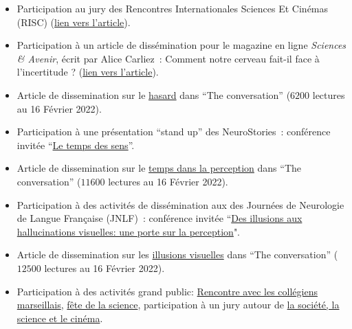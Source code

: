 \documentclass[10pt,french,a4paper,oneside]{article}%
\newcommand{\years}[1]{\marginpar{\textit{\scriptsize #1}}}
\begin{document}
\begin{itemize}
    \item Participation au jury des \og Rencontres Internationales Sciences Et Cinémas (RISC) \fg{} (\href{https://laurentperrinet.github.io/post/2023-12-16-risc/}{lien vers l'article}).

    \item Participation à un article de dissémination pour le magazine en ligne \textit{Sciences \& Avenir}, écrit par Alice Carliez~: \og Comment notre cerveau fait-il face à l'incertitude ? \fg{} (\href{https://laurentperrinet.github.io/post/2023-07-26-epsiloon/}{lien vers l'article}).

	\item Article de dissemination sur le \href{https://laurentperrinet.github.io/publication/perrinet-21-hasard/}{hasard} dans ``The conversation'' ($6200$ lectures au 16 Février 2022). \years{2022}

	\item Participation à une présentation ``stand up'' des NeuroStories~: conférence invitée  ``\href{https://laurentperrinet.github.io/post/2019-10-07_neurostories/}{Le temps des sens}''. \years{2019}

	\item Article de dissemination sur le \href{https://laurentperrinet.github.io/publication/perrinet-19-temps/}{temps dans la perception} dans ``The conversation'' ($11600$ lectures au 16 Février 2022).

	\item Participation à des activités de dissémination aux des Journées de Neurologie de Langue Française (JNLF)~: conférence invitée  ``\href{https://laurentperrinet.github.io/talk/2019-04-18-jnlf/}{Des illusions aux hallucinations visuelles: une porte sur la perception}".

	\item Article de dissemination sur les \href{https://theconversation.com/illusions-et-hallucinations-visuelles-une-porte-sur-la-perception-117389}{illusions visuelles} dans ``The conversation'' ($12500$ lectures au 16 Février 2022). \years{2018}

	\item Participation à des activités grand public: \href{https://laurentperrinet.github.io/talk/2019-01-10-polly-maggoo/}{Rencontre avec les collégiens marseillais}, \href{https://laurentperrinet.github.io/talk/2018-10-10-polly-maggoo/}{fête de la science}, participation à un jury autour de \href{https://laurentperrinet.github.io/talk/2017-11-17-festival-interferences/}{la société, la science et le cinéma}.


\end{itemize}
\end{document}
